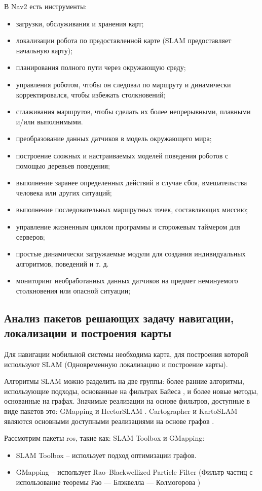 В Nav2 есть инструменты:
\begin{itemize}
	\item загрузки, обслуживания и хранения карт;
	\item локализации робота по предоставленной карте (SLAM предоставляет
		начальную карту);
	\item планирования полного пути через окружающую среду;
	\item управления роботом, чтобы он следовал по маршруту и динамически
		корректировался, чтобы избежать столкновений;
	\item сглаживания маршрутов, чтобы сделать их более непрерывными, плавными
		и/или выполнимыми.
	\item преобразование данных датчиков в модель окружающего мира;
	\item построение сложных и настраиваемых моделей поведения роботов с
		помощью деревьев поведения;
	\item выполнение заранее определенных действий в случае сбоя, вмешательства
		человека или других ситуаций;
	\item выполнение последовательных маршрутных точек, составляющих миссию;
	\item управление жизненным циклом программы и сторожевым таймером для
		серверов;
	\item простые динамически загружаемые модули для создания индивидуальных
		алгоритмов, поведений и т. д.
	\item мониторинг необработанных данных датчиков на предмет неминуемого
		столкновения или опасной ситуации;
\end{itemize}

\subsection{Анализ пакетов решающих задачу навигации, локализации и построения
карты}

Для навигации мобильной системы необходима карта, для построения которой
используют SLAM (Одновременную локализацию и построение карты). 

Алгоритмы SLAM можно разделить на две группы: более ранние алгоритмы,
использующие подходы, основанные на фильтрах Байеса , и более новые методы,
основанные на графах. Значимые реализации на основе фильтров, доступные в виде
пакетов \ros{} это: GMapping и HectorSLAM . Cartographer и KartoSLAM являются
основными доступными реализациями на основе графов \cite{macenski2021slam}.

Рассмотрим пакеты ros{}, такие как: SLAM Toolbox и GMapping:
\begin{itemize}
	\item SLAM Toolbox -- использует подход оптимизации
		графов.
	\item GMapping \cite{grisetti2005improving} -- использует Rao–Blackwellized
		Particle Filter (Фильтр частиц с использование теоремы Рао — Блэквелла —
		Колмогорова )
\end{itemize}

